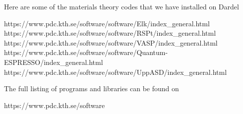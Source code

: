 
Here are some of the materials theory codes that we have installed on Dardel

https://www.pdc.kth.se/software/software/Elk/index_general.html
https://www.pdc.kth.se/software/software/RSPt/index_general.html
https://www.pdc.kth.se/software/software/VASP/index_general.html
https://www.pdc.kth.se/software/software/Quantum-ESPRESSO/index_general.html
https://www.pdc.kth.se/software/software/UppASD/index_general.html

The full listing of programs and libraries can be found on

https://www.pdc.kth.se/software
